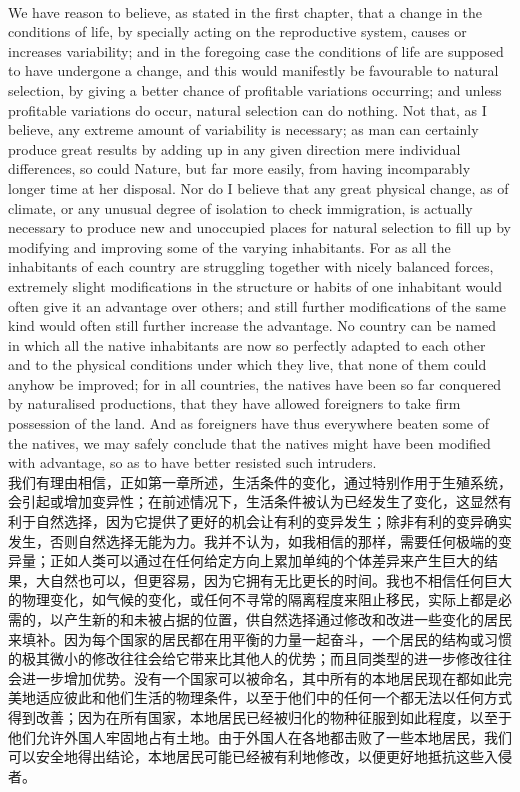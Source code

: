 \documentclass{article}
\begin{document}
\\
We have reason to believe, as stated in the first chapter, that a change in the conditions of life, by specially acting on the reproductive system, causes or increases variability; and in the foregoing case the conditions of life are supposed to have undergone a change, and this would manifestly be favourable to natural selection, by giving a better chance of profitable variations occurring; and unless profitable variations do occur, natural selection can do nothing. Not that, as I believe, any extreme amount of variability is necessary; as man can certainly produce great results by adding up in any given direction mere individual differences, so could Nature, but far more easily, from having incomparably longer time at her disposal. Nor do I believe that any great physical change, as of climate, or any unusual degree of isolation to check immigration, is actually necessary to produce new and unoccupied places for natural selection to fill up by modifying and improving some of the varying inhabitants. For as all the inhabitants of each country are struggling together with nicely balanced forces, extremely slight modifications in the structure or habits of one inhabitant would often give it an advantage over others; and still further modifications of the same kind would often still further increase the advantage. No country can be named in which all the native inhabitants are now so perfectly adapted to each other and to the physical conditions under which they live, that none of them could anyhow be improved; for in all countries, the natives have been so far conquered by naturalised productions, that they have allowed foreigners to take firm possession of the land. And as foreigners have thus everywhere beaten some of the natives, we may safely conclude that the natives might have been modified with advantage, so as to have better resisted such intruders.\\
我们有理由相信，正如第一章所述，生活条件的变化，通过特别作用于生殖系统，会引起或增加变异性；在前述情况下，生活条件被认为已经发生了变化，这显然有利于自然选择，因为它提供了更好的机会让有利的变异发生；除非有利的变异确实发生，否则自然选择无能为力。我并不认为，如我相信的那样，需要任何极端的变异量；正如人类可以通过在任何给定方向上累加单纯的个体差异来产生巨大的结果，大自然也可以，但更容易，因为它拥有无比更长的时间。我也不相信任何巨大的物理变化，如气候的变化，或任何不寻常的隔离程度来阻止移民，实际上都是必需的，以产生新的和未被占据的位置，供自然选择通过修改和改进一些变化的居民来填补。因为每个国家的居民都在用平衡的力量一起奋斗，一个居民的结构或习惯的极其微小的修改往往会给它带来比其他人的优势；而且同类型的进一步修改往往会进一步增加优势。没有一个国家可以被命名，其中所有的本地居民现在都如此完美地适应彼此和他们生活的物理条件，以至于他们中的任何一个都无法以任何方式得到改善；因为在所有国家，本地居民已经被归化的物种征服到如此程度，以至于他们允许外国人牢固地占有土地。由于外国人在各地都击败了一些本地居民，我们可以安全地得出结论，本地居民可能已经被有利地修改，以便更好地抵抗这些入侵者。\\
\end{document}
